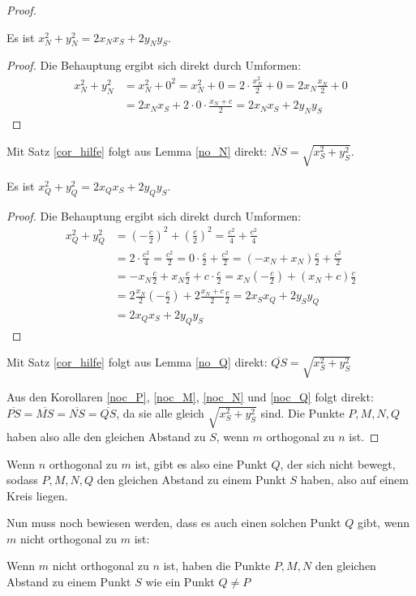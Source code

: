 \begin{proof}
\begin{lem}
        Es ist $x_N^2+y_N^2=2x_Nx_S+2y_Ny_S$.
    \end{lem}
    \begin{proof}
        Die Behauptung ergibt sich direkt durch Umformen:
        \begin{align*}
            x_N^2+y_N^2&=x_N^2+0^2=x_N^2+0=2\cdot \frac{x_N^2}{2}+0=2x_N\frac{x_N}{2}+0\\
            &=2x_Nx_S+2\cdot 0\cdot \frac{x_N+c}{2}=2x_Nx_S+2y_Ny_S
        \end{align*}
    \end{proof}
    \begin{cor}\label{noc_N}
        Mit Satz \ref{cor_hilfe} folgt aus Lemma \ref{no_N} direkt: $\overline{NS}=\sqrt{x_S^2+y_S^2}$.
    \end{cor}
    \begin{lem}\label{no_Q}
        Es ist $x_Q^2+y_Q^2=2x_Qx_S+2y_Qy_S$.
    \end{lem}
    \begin{proof}
        Die Behauptung ergibt sich direkt durch Umformen:
        \begin{align*}
            x_Q^2+y_Q^2&=\left(-\frac{c}{2}\right)^2+\left(\frac{c}{2}\right)^2=\frac{c^2}{4}+\frac{c^2}{4}\\
            &=2\cdot \frac{c^2}{4}=\frac{c^2}{2}=0\cdot \frac{c}{2}+\frac{c^2}{2}=(-x_N+x_N)\frac{c}{2}+\frac{c^2}{2}\\
            &=-x_N\frac{c}{2}+x_N\frac{c}{2}+c\cdot\frac{c}{2}=x_N\left(-\frac{c}{2}\right)+(x_N+c)\frac{c}{2}\\
            &=2\frac{x_N}{2}\left(-\frac{c}{2}\right)+2\frac{x_N+c}{2}\frac{c}{2}=2x_Sx_Q+2y_Sy_Q\\
            &=2x_Qx_S+2y_Qy_S
        \end{align*}
    \end{proof}
    \begin{cor}\label{noc_Q}
        Mit Satz \ref{cor_hilfe}  folgt aus Lemma \ref{no_Q} direkt: $\overline{QS}=\sqrt{x_S^2+y_S^2}$
    \end{cor}
    Aus den Korollaren \ref{noc_P}, \ref{noc_M}, \ref{noc_N} und \ref{noc_Q} folgt direkt: 
    $\overline{PS}=\overline{MS}=\overline{NS}=\overline{QS}$, da sie alle gleich $\sqrt{x_S^2+y_S^2}$ sind. Die 
    Punkte $P, M, N, Q$ haben also alle den gleichen Abstand zu $S$, wenn $m$ orthogonal zu $n$ ist.
    \renewcommand{\qedsymbol}{$\blacksquare$}
\end{proof}

Wenn $n$ orthogonal zu $m$ ist, gibt es also eine Punkt $Q$, der sich nicht bewegt, sodass $P, M, N, Q$ den gleichen 
Abstand zu einem Punkt $S$ haben, also auf einem Kreis liegen.

Nun muss noch bewiesen werden, dass es auch einen solchen Punkt $Q$ gibt, wenn $m$ nicht orthogonal zu $m$ ist:

\begin{thm}
    Wenn $m$ nicht orthogonal zu $n$ ist, haben die Punkte $P, M, N$ den gleichen Abstand zu einem Punkt $S$ wie 
    ein Punkt $Q\neq P$
\end{thm}